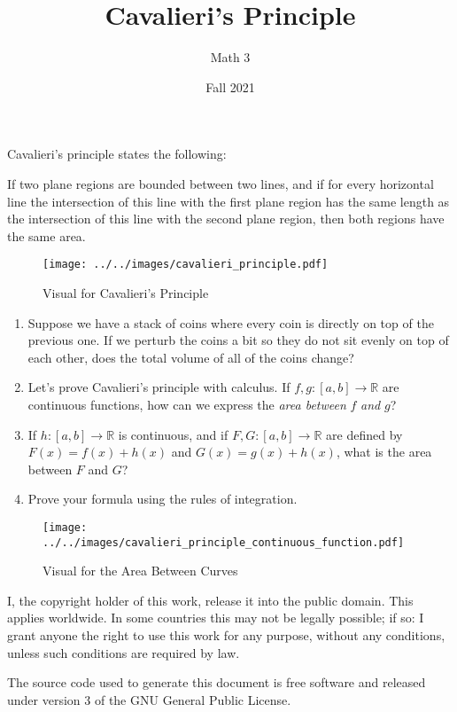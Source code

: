 \documentclass{article}
\title{Cavalieri's Principle}
\author{Math 3}
\date{Fall 2021}
\theoremstyle{normal}
\theoremstyle{plain}
\begin{document}
    \maketitle
    Cavalieri's principle states the following:
    \begin{center}
        If two plane regions are bounded between two lines, and if for every
        horizontal line the intersection of this line with the first plane
        region has the same length as the intersection of this line with the
        second plane region, then both regions have the same area.
    \end{center}
    \begin{figure}[H]
        \centering
        \texttt{[image: ../../images/cavalieri\_principle.pdf]}
        \caption{Visual for Cavalieri's Principle}
    \end{figure}
    \begin{enumerate}
        \item
        Suppose we have a stack of coins where every coin is directly on top of
        the previous one. If we perturb the coins a bit so they do not sit
        evenly on top of each other, does the total volume of all of the coins
        change?
        \item
        Let's prove Cavalieri's principle with calculus. If
        $f,g:[a,b]\rightarrow\mathbb{R}$ are continuous functions, how can we
        express the \textit{area between} $f$ \textit{and} $g$?
        \item
        If $h:[a,b]\rightarrow\mathbb{R}$ is continuous, and if
        $F,G:[a,b]\rightarrow\mathbb{R}$ are defined by
        $F(x)=f(x)+h(x)$ and $G(x)=g(x)+h(x)$, what is the area between $F$
        and $G$?
        \item
        Prove your formula using the rules of integration.
    \end{enumerate}
    \begin{figure}[H]
        \centering
        \texttt{[image: ../../images/cavalieri\_principle\_continuous\_function.pdf]}
        \caption{Visual for the Area Between Curves}
    \end{figure}
    I, the copyright holder of this work, release it into the public domain.
    This applies worldwide. In some countries this may not be legally possible;
    if so: I grant anyone the right to use this work for any purpose, without
    any conditions, unless such conditions are required by law.
    \par\hfill\par
    The source code used to generate this document is free software and released
    under version 3 of the GNU General Public License.
\end{document}
